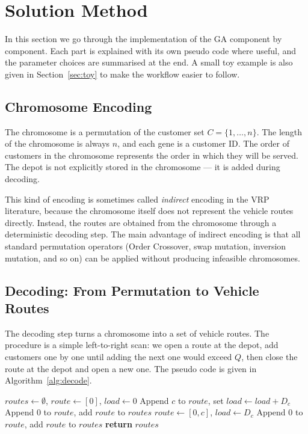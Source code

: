\documentclass [a4paper, 11pt, titlepage] {article}
\begin{document}
\section{Solution Method}
\label{sec:solution}

In this section we go through the implementation of the GA component by component. Each part is explained with its own pseudo code where useful, and the parameter choices are summarised at the end. A small toy example is also given in Section~\ref{sec:toy} to make the workflow easier to follow.

\subsection{Chromosome Encoding}
\label{sec:encoding}

The chromosome is a permutation of the customer set $C = \{1, \ldots, n\}$. The length of the chromosome is always $n$, and each gene is a customer ID. The order of customers in the chromosome represents the order in which they will be served. The depot is not explicitly stored in the chromosome --- it is added during decoding.

This kind of encoding is sometimes called \emph{indirect} encoding in the VRP literature, because the chromosome itself does not represent the vehicle routes directly. Instead, the routes are obtained from the chromosome through a deterministic decoding step. The main advantage of indirect encoding is that all standard permutation operators (Order Crossover, swap mutation, inversion mutation, and so on) can be applied without producing infeasible chromosomes.

\subsection{Decoding: From Permutation to Vehicle Routes}
\label{sec:decoding}

The decoding step turns a chromosome into a set of vehicle routes. The procedure is a simple left-to-right scan: we open a route at the depot, add customers one by one until adding the next one would exceed $Q$, then close the route at the depot and open a new one. The pseudo code is given in Algorithm~\ref{alg:decode}.

\begin{algorithm}[H]
\caption{Permutation Decoder}
\label{alg:decode}
\begin{algorithmic}[1]
    \STATE $routes \gets \emptyset$, $route \gets [0]$, $load \gets 0$
            \STATE Append $c$ to $route$, set $load \gets load + D_c$
        \ELSE
            \STATE Append $0$ to $route$, add $route$ to $routes$
            \STATE $route \gets [0, c]$, $load \gets D_c$
        \ENDIF
    \ENDFOR
    \STATE Append $0$ to $route$, add $route$ to $routes$
    \STATE \textbf{return} $routes$
\end{algorithmic}
\end{algorithm}
\end{document}
